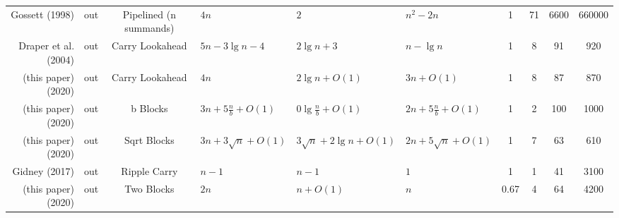 \begin{tabular}{r|c|c|l|l|l|c|c|c|c}
\hline
Gossett (1998) \cite{gossett1998carrysave}           &out   &Pipelined (n summands) &$4n$                        &$2$                        &$n^2 - 2n$                 &1    &71            &6600            &660000            \\
Draper et al. (2004) \cite{draper2004lookaheadadder} &out   &Carry Lookahead        &$5n - 3\lg n - 4$           &$2\lg n + 3$               &$n - \lg n$                &1    &8             &91              &920               \\
(this paper) (2020)                                  &out   &Carry Lookahead        &$4n$                        &$2\lg n + O(1)$            &$3n + O(1)$                &1    &8             &87              &870               \\
(this paper) (2020)                                  &out   &b Blocks               &$3n + 5\frac{n}{b} + O(1)$  &$0\lg \frac{n}{b} + O(1)$  &$2n + 5\frac{n}{b} + O(1)$ &1    &2             &100             &1000              \\
(this paper) (2020)                                  &out   &Sqrt Blocks            &$3n + 3\sqrt n + O(1)$      &$3\sqrt n + 2\lg n + O(1)$ &$2n + 5\sqrt n + O(1)$     &1    &7             &63              &610               \\
Gidney (2017) \cite{gidney2018halving}               &out   &Ripple Carry           &$n - 1$                     &$n - 1$                    &$1$                        &1    &1             &41              &3100              \\
(this paper) (2020)                                  &out   &Two Blocks             &$2n$                        &$n + O(1)$                 &$n$                        &0.67 &4             &64              &4200              \\
\end{tabular}
